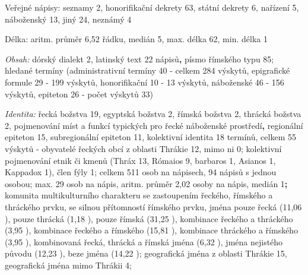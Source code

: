 Veřejné nápisy: seznamy 2, honorifikační dekrety 63, státní dekrety 6, nařízení 5, náboženský 13, jiný 24, neznámý 4

Délka: aritm. průměr 6,52 řádku, medián 5, max. délka 62, min. délka 1

{\em Obsah:} dórský dialekt 2, latinský text 22 nápisů{\bf ,} písmo římského typu 85; hledané termíny (administrativní termíny 40 - celkem 284 výskytů, epigrafické formule 29 - 199 výskytů, honorifikační 10 - 13 výskytů, náboženské 46 - 156 výskytů, epiteton 26 - počet výskytů 33)

{\em Identita:} řecká božstva 19, egyptská božstva 2, římská božstva 2, thrácká božstva 2, pojmenování míst a funkcí typických pro řecké náboženské prostředí{\bf ,} regionální epiteton 15, subregionální epiteton 11, kolektivní identita 18 termínů, celkem 55 výskytů - obyvatelé řeckých obcí z oblasti Thrákie 12, mimo ni 0; kolektivní pojmenování etnik či kmenů (Thráx 13, Rómaios 9, barbaros 1, Asianos 1, Kappadox 1), člen fýly 1; celkem 511 osob na nápisech, 94 nápisů s jednou osobou; max. 29 osob na nápis, aritm. průměr 2,02 osoby na nápis, medián 1{\bf ;} komunita multikulturního charakteru se zastoupením řeckého, římského a thráckého prvku, se silnou přítomností římského prvku, jména pouze řecká (11,06 ), pouze thrácká (1,18 ), pouze římská (31,25 ), kombinace řeckého a thráckého (3,95 ), kombinace řeckého a římského (15,81 ), kombinace thráckého a římského (3,95 ), kombinovaná řecká, thrácká a římská jména (6,32 ), jména nejistého původu (12,23 ), beze jména (14,22 ); geografická jména z oblasti Thrákie 15, geografická jména mimo Thrákii 4;

\NC\AR
\HL
\HL
\stoptable

